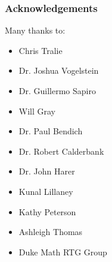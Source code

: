 \documentclass{beamer}
\begin{document}
\begin{frame}
\frametitle{Acknowledgements}
Many thanks to:
\begin{itemize}
\item Chris Tralie
\item Dr. Joshua Vogelstein
\item Dr. Guillermo Sapiro
\item Will Gray 
\item Dr. Paul Bendich 
\item Dr. Robert Calderbank
\item Dr. John Harer
\item Kunal Lillaney
\item Kathy Peterson 
\item Ashleigh Thomas 
\item Duke Math RTG Group 
\end{itemize}
\end{frame}
\end{document}
